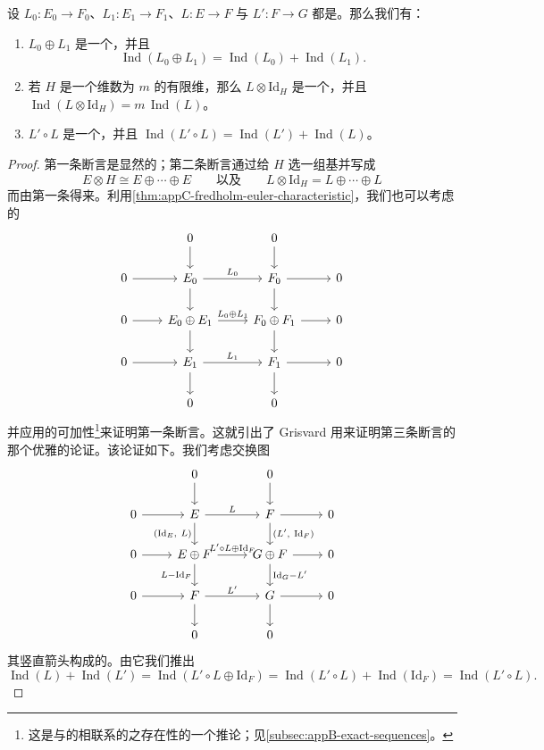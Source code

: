 \begin{proposition}\label{thm:appC-fredholm-direct-sum}
设 $L_0 : E_0 \to F_0$、$L_1 : E_1 \to F_1$、$L : E \to F$ 与 $L' : F \to G$ 都是\trFredholmOperator。那么我们有：
\begin{enumerate}[label=(\arabic*)]
\item $L_0 \oplus L_1$ 是一个\trFredholmOperator，并且
\[
\operatorname{Ind}(L_0 \oplus L_1) = \operatorname{Ind}(L_0) + \operatorname{Ind}(L_1).
\]
\item 若 $H$ 是一个维数为 $m$ 的有限维\trVectorSpace，那么 $L \otimes \mathrm{Id}_H$ 是一个\trFredholmOperator，并且\trIndex{} $\operatorname{Ind}(L \otimes \mathrm{Id}_H) = m\,\operatorname{Ind}(L)$。
\item $L' \circ L$ 是一个\trFredholmOperator，并且 $\operatorname{Ind}(L' \circ L) = \operatorname{Ind}(L') + \operatorname{Ind}(L)$。
\end{enumerate}
\end{proposition}

\begin{proof}
第一条断言是显然的；第二条断言通过给 $H$ 选一组基并写成
\[
E \otimes H \cong E \oplus \cdots \oplus E \qquad\text{以及}\qquad L \otimes \mathrm{Id}_H = L \oplus \cdots \oplus L
\]
而由第一条得来。利用\cref{thm:appC-fredholm-euler-characteristic}，我们也可以考虑\trChainComplex{}的\trShortExactSequence
\[
\begin{tikzcd}
 & 0 \arrow[d] & 0 \arrow[d] \\
0 \arrow[r] & E_0 \arrow[r, "L_0"] \arrow[d] & F_0 \arrow[r] \arrow[d] & 0 \\
0 \arrow[r] & E_0 \oplus E_1 \arrow[r, "L_0 \oplus L_1"] \arrow[d] & F_0 \oplus F_1 \arrow[r] \arrow[d] & 0 \\
0 \arrow[r] & E_1 \arrow[r, "L_1"] \arrow[d] & F_1 \arrow[r] \arrow[d] & 0 \\
 & 0 & 0
\end{tikzcd}
\]
并应用\trEulerCharacteristic{}的可加性\footnote{这是与\trChainComplex{}的\trShortExactSequence{}相联系的\trLongExactSequence{}之存在性的一个推论；见\cref{subsec:appB-exact-sequences}。}来证明第一条断言。这就引出了 Grisvard 用来证明第三条断言的那个优雅的论证。该论证如下。我们考虑交换图
\[
\begin{tikzcd}
 & 0 \arrow[d] & 0 \arrow[d] \\
0 \arrow[r] & E \arrow[r, "L"] \arrow[d, "{(\mathrm{Id}_E,\ L)}"'] & F \arrow[r] \arrow[d, "{(L',\ \mathrm{Id}_F)}"] & 0 \\
0 \arrow[r] & E \oplus F \arrow[r, "L' \circ L \oplus \mathrm{Id}_F"] \arrow[d, "L - \mathrm{Id}_F"'] & G \oplus F \arrow[r] \arrow[d, "\mathrm{Id}_G - L'"] & 0 \\
0 \arrow[r] & F \arrow[r, "L'"] \arrow[d] & G \arrow[r] \arrow[d] & 0 \\
 & 0 & 0
\end{tikzcd}
\]
其竖直箭头构成\trComplex{}的\trShortExactSequence。由它我们推出
\[
\operatorname{Ind}(L) + \operatorname{Ind}(L') = \operatorname{Ind}(L' \circ L \oplus \mathrm{Id}_F) = \operatorname{Ind}(L' \circ L) + \operatorname{Ind}(\mathrm{Id}_F) = \operatorname{Ind}(L' \circ L).
\]
\end{proof}

